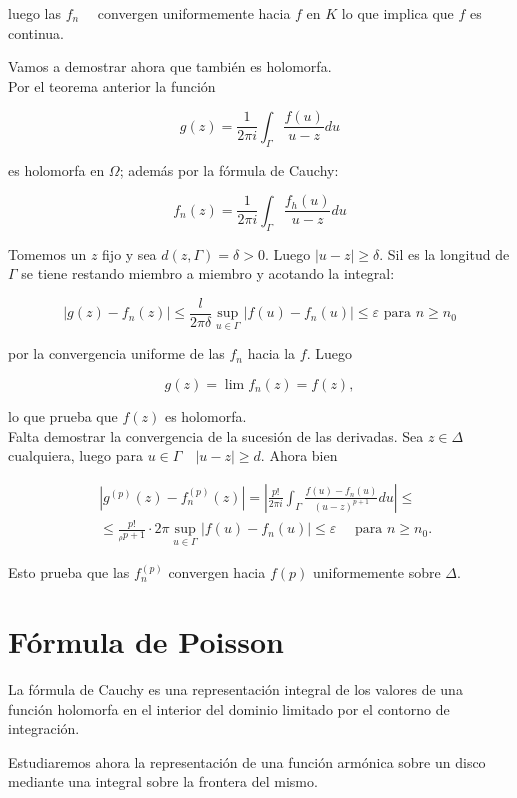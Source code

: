 \documentclass[10pt]{article}
\theoremstyle{plain}
\theoremstyle{definition}
\theoremstyle{remark}
\begin{document}
luego las $f_{n} \quad$ convergen uniformemente hacia $f$ en $K$ lo que implica que $f$ es continua.

Vamos a demostrar ahora que también es holomorfa.\\
Por el teorema anterior la función

$$
g(z)=\frac{1}{2 \pi i} \int_{\Gamma} \frac{f(u)}{u-z} d u
$$

es holomorfa en $\Omega$; además por la fórmula de Cauchy:

$$
f_{n}(z)=\frac{1}{2 \pi i} \int_{\Gamma} \frac{f_{h}(u)}{u-z} d u
$$

Tomemos un $z$ fijo y sea $d(z, \Gamma)=\delta>0$. Luego $|u-z| \geqslant \delta$. Sil es la longitud de $\Gamma$ se tiene restando miembro a miembro y acotando la integral:

$$
\left|g(z)-f_{n}(z)\right| \leqslant \frac{l}{2 \pi \delta} \sup _{u \in \Gamma}\left|f(u)-f_{n}(u)\right| \leqslant \varepsilon \text { para } n \geqslant n_{0}
$$

por la convergencia uniforme de las $f_{n}$ hacia la $f$. Luego

$$
g(z)=\lim f_{n}(z)=f(z),
$$

lo que prueba que $f(z)$ es holomorfa.\\
Falta demostrar la convergencia de la sucesión de las derivadas. Sea $z \in \Delta$ cualquiera, luego para $u \in \Gamma \quad|u-z| \geqslant d$. Ahora bien

$$
\begin{aligned}
& \left|g^{(p)}(z)-f_{n}^{(p)}(z)\right|=\left|\frac{p!}{2 \pi i} \int_{\Gamma} \frac{f(u)-f_{n}(u)}{(u-z)^{p+1}} d u\right| \leqslant \\
& \leqslant \frac{p!}{{ }_{\rho} p+1} \cdot 2 \pi \sup _{u \in \Gamma}\left|f(u)-f_{n}(u)\right| \leqslant \varepsilon \quad \text { para } n \geqslant n_{0} .
\end{aligned}
$$

Esto prueba que las $f_{n}^{(p)}$ convergen hacia $f(p)$ uniformemente sobre $\Delta$.

\section{Fórmula de Poisson}
La fórmula de Cauchy es una representación integral de los valores de una función holomorfa en el interior del dominio limitado por el contorno de integración.

Estudiaremos ahora la representación de una función armónica sobre un disco mediante una integral sobre la frontera del mismo.
\end{document}
